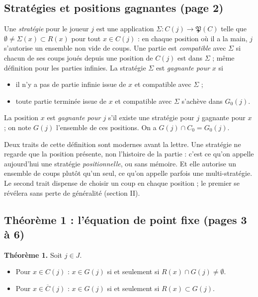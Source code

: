 \documentclass[11pt,a4paper]{article}
\begin{document}
\subsection*{Stratégies et positions gagnantes (page 2)}

Une \emph{stratégie} pour le joueur $j$ est une application
$\Sigma : C(j) \to \mathfrak{P}(C)$ telle que
$\emptyset \neq \Sigma(x) \subset R(x)$ pour tout $x \in C(j)$ : en chaque
position où il a la main, $j$ s'autorise un ensemble non vide de coups. Une
partie est \emph{compatible} avec $\Sigma$ si chacun de ses coups joués depuis
une position de $C(j)$ est dans $\Sigma$ ; même définition pour les parties
infinies. La stratégie $\Sigma$ est \emph{gagnante pour $x$} si
\begin{itemize}
  \item[a)] il n'y a pas de partie infinie issue de $x$ et compatible avec
  $\Sigma$ ;
  \item[b)] toute partie terminée issue de $x$ et compatible avec $\Sigma$
  s'achève dans $G_0(j)$.
\end{itemize}
La position $x$ est \emph{gagnante pour $j$} s'il existe une stratégie pour
$j$ gagnante pour $x$ ; on note $G(j)$ l'ensemble de ces positions. On a
$G(j) \cap C_0 = G_0(j)$.

Deux traits de cette définition sont modernes avant la lettre. Une stratégie
ne regarde que la position présente, non l'histoire de la partie : c'est ce
qu'on appelle aujourd'hui une stratégie \emph{positionnelle}, ou sans
mémoire. Et elle autorise un ensemble de coups plutôt qu'un seul, ce qu'on
appelle parfois une multi-stratégie. Le second trait dispense de choisir un
coup en chaque position ; le premier se révélera sans perte de généralité
(section II).

\subsection*{Théorème 1 : l'équation de point fixe (pages 3 à 6)}

\textbf{Théorème 1.} Soit $j \in J$.
\begin{itemize}
  \item[1°)] Pour $x \in C(j)$ : $x \in G(j)$ si et seulement si
  $R(x) \cap G(j) \neq \emptyset$.
  \item[2°)] Pour $x \in \overline{C}(j)$ : $x \in G(j)$ si et seulement si
  $R(x) \subset G(j)$.
\end{itemize}
\end{document}
